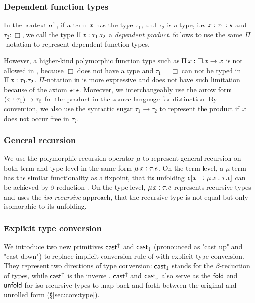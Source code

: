\subsubsection{Dependent function types}
In the context of \cc, if a term $\mathit{x}$ has the type $\tau_{{\mathrm{1}}}$, and $\tau_{{\mathrm{2}}}$ is a type, i.e. $\mathit{x}:\tau_{{\mathrm{1}}}:\star$ and $\tau_{{\mathrm{2}}}:\Box$, we call the type $\Pi \, \mathit{x}  :  \tau_{{\mathrm{1}}}  .  \tau_{{\mathrm{2}}}$ a \emph{dependent product}. \name follows \cc to use the same $ \Pi $-notation to represent dependent function types.

However, a higher-kind polymorphic function type such as $\Pi \, \mathit{x}  :  \Box  .  \mathit{x}  \rightarrow  \mathit{x}$ is not allowed in \cc, because $\Box$ does not have a type and $\tau_{{\mathrm{1}}}=\Box$ can not be typed in $\Pi \, \mathit{x}  :  \tau_{{\mathrm{1}}}  .  \tau_{{\mathrm{2}}}$.  $ \Pi $-notation in \name is more expressive and does not have such limitation because of the axiom $\star:\star$. Moreover, we interchangeably use the arrow form $(  \mathit{x}  :  \tau_{{\mathrm{1}}}  )  \rightarrow  \tau_{{\mathrm{2}}}$ for the product in the source language for distinction. By convention, we also use the syntactic sugar $\tau_{{\mathrm{1}}}  \longrightarrow  \tau_{{\mathrm{2}}}$ to represent the product if $\mathit{x}$ does not occur free in $\tau_{{\mathrm{2}}}$.

\subsubsection{General recursion}
We use the polymorphic recursion operator $ \mu $ to represent general recursion on both term and type level in the same form $\mu \, \mathit{x}  :  \tau  .  \mathit{e}$. On the term level, a $ \mu $-term has the similar functionality as a fixpoint, that its unfolding $\mathit{e}  [  \mathit{x}  \mapsto  \mu \, \mathit{x}  :  \tau  .  \mathit{e}  ]$ can be achieved by $\beta$-reduction . On the type level, $\mu \, \mathit{x}  :  \tau  .  \mathit{e}$ represents recursive types and uses the \emph{iso-recursive} approach, that the recursive type is not equal but only isomorphic to its unfolding.

\subsubsection{Explicit type conversion}
We introduce two new primitives $ \mathsf{cast}^{\uparrow} $ and $ \mathsf{cast}_{\downarrow} $ (pronounced as "cast up" and "cast down") to replace implicit conversion rule of \cc with explicit type conversion. They represent two directions of type conversion: $ \mathsf{cast}_{\downarrow} $ stands for the $\beta$-reduction of types, while $ \mathsf{cast}^{\uparrow} $ is the inverse . $ \mathsf{cast}^{\uparrow} $ and $ \mathsf{cast}_{\downarrow} $ also serve as the $\mathsf{fold}$ and $\mathsf{unfold}$ for iso-recursive types to map back and forth between the original and unrolled form (\S \ref{sec:core:type}).

